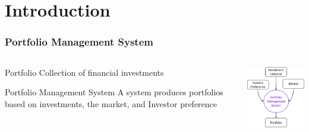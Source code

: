 \section{Introduction}
\begin{frame}
\frametitle{Portfolio Management System}
\begin{columns}
\begin{column}{0.55\textwidth}
\begin{block}{Portfolio}
Collection of financial investments
\end{block}
\begin{block}{Portfolio Management System}
A system produces portfolios based on investments, the market, and Investor preference
\end{block}
\end{column}
\begin{column}{0.45\textwidth}
\begin{center}
\includegraphics[width=4.8cm]{images/portfolio_management_system.png}
\end{center}
\end{column}
\end{columns}
\end{frame}



